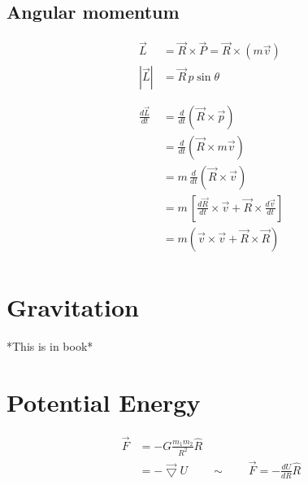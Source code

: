 \documentclass[12pt]{article}
\begin{document}
\subsection{Angular momentum}
\begin{align*}
	\overrightarrow{L}              & = \overrightarrow{R} \times \overrightarrow{P} = \overrightarrow{R} \times (m \overrightarrow{v})                                       \\
	\left|\overrightarrow{L}\right| & = \overrightarrow{R} \, p \sin{\theta}                                                                                                  \\
	\phantom{=}                                                                                                                                                               \\
	\frac{d\overrightarrow{L}}{dt}  & = \frac{d}{dt}\left(\overrightarrow{R} \times \overrightarrow{p}\right)                                                                 \\
	                                & = \frac{d}{dt}\left(\overrightarrow{R} \times m \overrightarrow{v}\right)                                                               \\
	                                & = m \, \frac{d}{dt}\left(\overrightarrow{R} \times \overrightarrow{v}\right)                                                            \\
	                                & = m \, \left[\frac{d\overrightarrow{R}}{dt} \times \overrightarrow{v} + \overrightarrow{R} \times \frac{d\overrightarrow{v}}{dt}\right] \\
	                                & = m \left(\overrightarrow{v} \times \overrightarrow{v} + \overrightarrow{R} \times \overrightarrow{R}\right)                            \\
\end{align*}

\section{Gravitation}
*This is in book*

\section{Potential Energy}
\begin{align*}
	\overrightarrow{F} &= - G\frac{m_1m_2}{R^2} \hat{R}\\
	&= -\overrightarrow{\bigtriangledown} U \qquad \sim \qquad \overrightarrow{F} = -\frac{dU}{dR}\hat{R}\\
\end{align*}
\end{document}
